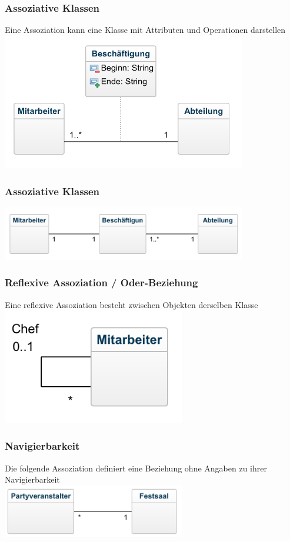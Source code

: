 \begin{frame}
\frametitle{Assoziative Klassen}
	Eine Assoziation kann eine Klasse mit Attributen und Operationen darstellen
	\center
	\includegraphics[width=0.8\textwidth,
	keepaspectratio=true]{bilder/asso_klasse.png}
\end{frame}

\begin{frame}
\frametitle{Assoziative Klassen}
	\center
	\includegraphics[width=0.8\textwidth,
	keepaspectratio=true]{bilder/asso_klasse_detail.png}
\end{frame}

\begin{frame}
\frametitle{Reflexive Assoziation / Oder-Beziehung}
	Eine reflexive Assoziation besteht zwischen Objekten derselben Klasse\\
	\center
	\includegraphics[width=0.6\textwidth,
	keepaspectratio=true]{bilder/asso_reflexiv.png}
\end{frame}

\begin{frame}
\frametitle{Navigierbarkeit}
	Die folgende Assoziation definiert eine Beziehung ohne Angaben zu ihrer Navigierbarkeit\\
	\center
	\includegraphics[width=0.6\textwidth,
	keepaspectratio=true]{bilder/asso_navi1.png}
\end{frame}

